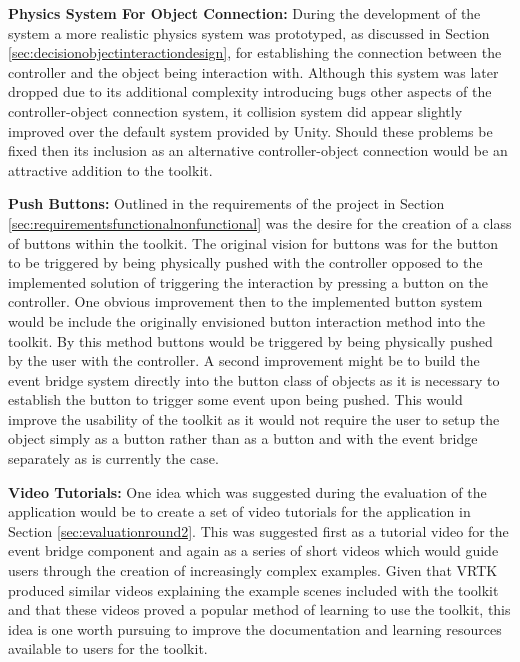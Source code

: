 \documentclass{l4proj}
\begin{document}
\textbf{Physics System For Object Connection:} During the development of the system a more realistic physics system was prototyped, as discussed in Section \ref{sec:decisionobjectinteractiondesign}, for establishing the connection between the controller and the object being interaction with. Although this system was later dropped due to its additional complexity introducing bugs other aspects of the controller-object connection system, it collision system did appear slightly improved over the default system provided by Unity. Should these problems be fixed then its inclusion as an alternative controller-object connection would be an attractive addition to the toolkit. 

\textbf{Push Buttons:} Outlined in the requirements of the project in Section \ref{sec:requirementsfunctionalnonfunctional} was the desire for the creation of a class of buttons within the toolkit. The original vision for buttons was for the button to be triggered by being physically pushed with the controller opposed to the implemented solution of triggering the interaction by pressing a button on the controller. One obvious improvement then to the implemented button system would be include the originally envisioned button interaction method into the toolkit. By this method buttons would be triggered by being physically pushed by the user with the controller. A second improvement might be to build the event bridge system directly into the button class of objects as it is necessary to establish the button to trigger some event upon being pushed. This would improve the usability of the toolkit as it would not require the user to setup the object simply as a button rather than as a button and with the event bridge separately as is currently the case.

\textbf{Video Tutorials:} One idea which was suggested during the evaluation of the application would be to create a set of video tutorials for the application in Section \ref{sec:evaluationround2}. This was suggested first as a tutorial video for the event bridge component and again as a series of short videos which would guide users through the creation of increasingly complex examples. Given that VRTK produced similar videos explaining the example scenes included with the toolkit and that these videos proved a popular method of learning to use the toolkit, this idea is one worth pursuing to improve the documentation and learning resources available to users for the toolkit.
\end{document}
